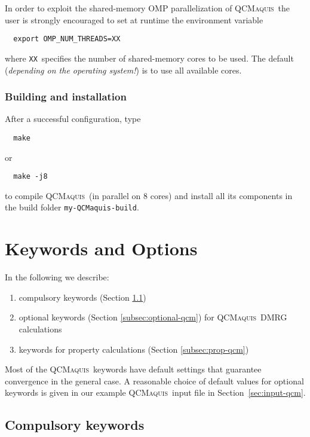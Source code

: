 \documentclass[bibliography=totoc,12pt,a4paper]{scrartcl}
\newcommand{\qcm}{\textsc{QCMaquis}}
\newcommand{\qcmbuild}{\texttt{my-QCMaquis-build}}
\begin{document}
\vspace{2ex}

In order to exploit the shared-memory OMP parallelization of \qcm\ the user is strongly encouraged to set at runtime the environment variable

\begin{verbatim}
  export OMP_NUM_THREADS=XX
\end{verbatim}
%
where \texttt{XX}\ specifies the number of shared-memory cores to be used.
The default (\emph{depending on the operating system!}) is to use all available cores.

\subsubsection{Building and installation}
\label{subsubsec:build-stand}

After a successful configuration, type
\begin{verbatim}
  make
\end{verbatim}
%
or

\begin{verbatim}
  make -j8
\end{verbatim}
%
to compile \qcm\ (in parallel on 8 cores) and install all its components in the build folder \texttt{\qcmbuild}.

\section{Keywords and Options}
\label{sec:qcmaquis-kw}

In the following we describe:

\begin{enumerate} 
  \item compulsory keywords (Section \ref{subsec:compul-qcm})
  \item optional keywords (Section \ref{subsec:optional-qcm}) for \qcm\ DMRG calculations 
  \item keywords for property calculations (Section \ref{subsec:prop-qcm})
\end{enumerate}

Most of the \qcm\ keywords have default settings that guarantee convergence in the general case.
A reasonable choice of default values for optional keywords is given in our example \qcm\ input file in Section~\ref{sec:input-qcm}.

\subsection{Compulsory keywords}
\label{subsec:compul-qcm}
\end{document}
